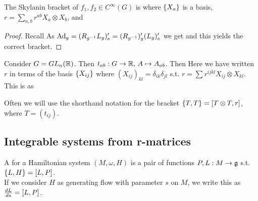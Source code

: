 \documentclass{article}
\begin{document}
\begin{prop}
The Skylanin bracket of $f_1,f_2 \in C^\infty(G)$ is 
where $\pbrace{X_a}$ is a basis, $r = \sum_{a,b} r^{ab} X_a \otimes X_b$, and 
\end{prop}
\begin{proof}
Recall 
As $\Ad_g = (R_{g^{-1}} L_g)^\prime_e = (R_{g^{-1}})^\prime_g (L_g)^\prime_e$ we get 
and this yields the correct bracket. 
\end{proof}

\begin{example}
Consider $G = GL_n(\mbb{R})$. Then $t_{ab} : G \to \mbb{R}, \, A \mapsto A_{ab}$. Then 
Here we have written $r$ in terms of the basis $\pbrace{X_{ij}}$ where $(X_{ij})_{kl} = \delta_{ik}\delta_{jl}$ s.t. $r = \sum r^{ijkl} X_{ij} \otimes X_{kl}$. This is as 
\end{example}

Often we will use the shorthand notation for the bracket $\acomm[T]{T} = \comm[T\otimes T]{r}$, where $T = (t_{ij})$.

\subsection{Integrable systems from r-matrices}

\begin{definition}
A  for a Hamiltonian system $(M,\omega,H)$ is a pair of functions $P,L : M \to \mf{g}$ s.t.
$ \acomm[L]{H} = \comm[L]{P}$. \\
If we consider $H$ as generating flow with parameter $s$ on $M$, we write this as $\frac{dL}{ds} = \comm[L]{P}$. 
\end{definition}
\end{document}
